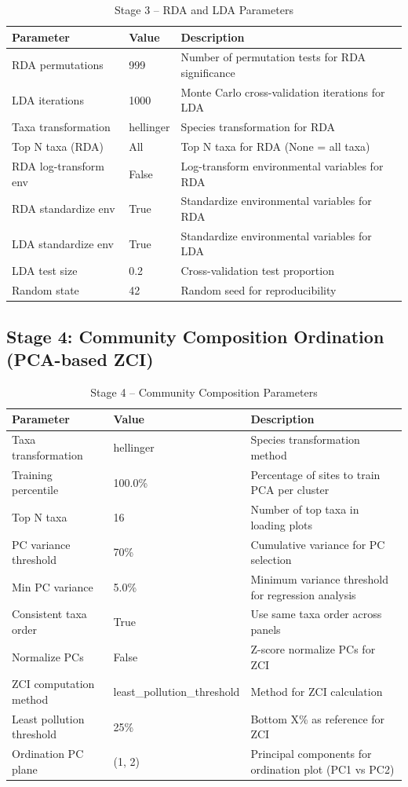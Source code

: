 \begin{table}[H]
\centering
\caption{Stage 3 -- RDA and LDA Parameters}
\label{tab:stage3_params}
\begin{tabular}{l|l|p{6cm}}
\hline
\textbf{Parameter} & \textbf{Value} & \textbf{Description} \\
\hline
RDA permutations & 999 & Number of permutation tests for RDA significance \\
LDA iterations & 1000 & Monte Carlo cross-validation iterations for LDA \\
Taxa transformation & hellinger & Species transformation for RDA \\
Top N taxa (RDA) & All & Top N taxa for RDA (None = all taxa) \\
RDA log-transform env & False & Log-transform environmental variables for RDA \\
RDA standardize env & True & Standardize environmental variables for RDA \\
LDA standardize env & True & Standardize environmental variables for LDA \\
LDA test size & 0.2 & Cross-validation test proportion \\
Random state & 42 & Random seed for reproducibility \\
\hline
\end{tabular}
\end{table}

\subsection*{Stage 4: Community Composition Ordination (PCA-based ZCI)}

\begin{table}[H]
\centering
\caption{Stage 4 -- Community Composition Parameters}
\label{tab:stage4_params}
\begin{tabular}{l|l|p{6cm}}
\hline
\textbf{Parameter} & \textbf{Value} & \textbf{Description} \\
\hline
Taxa transformation & hellinger & Species transformation method \\
Training percentile & 100.0\% & Percentage of sites to train PCA per cluster \\
Top N taxa & 16 & Number of top taxa in loading plots \\
PC variance threshold & 70\% & Cumulative variance for PC selection \\
Min PC variance & 5.0\% & Minimum variance threshold for regression analysis \\
Consistent taxa order & True & Use same taxa order across panels \\
Normalize PCs & False & Z-score normalize PCs for ZCI \\
ZCI computation method & least\_pollution\_threshold & Method for ZCI calculation \\
Least pollution threshold & 25\% & Bottom X\% as reference for ZCI \\
Ordination PC plane & (1, 2) & Principal components for ordination plot (PC1 vs PC2) \\
\hline
\end{tabular}
\end{table}

